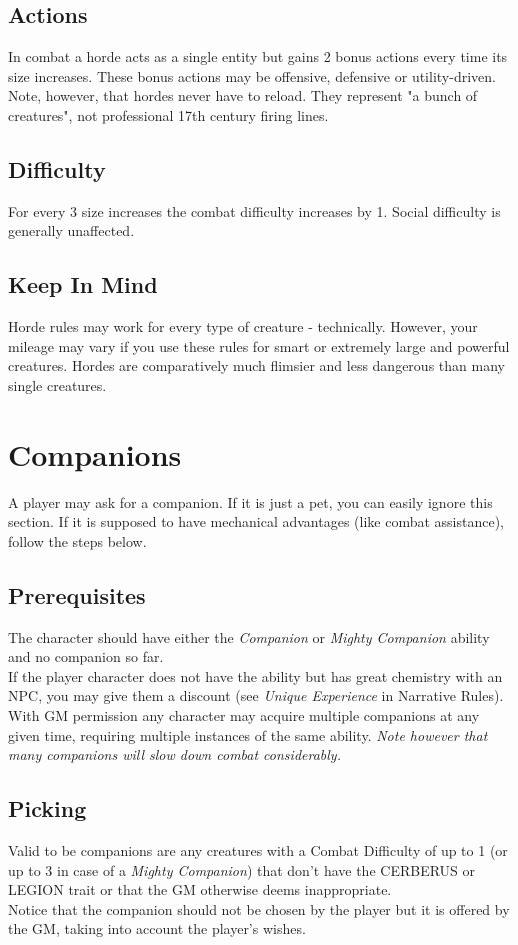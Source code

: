 \documentclass[12pt,a4paper,openany,usenames,dvipsnames]{book}
\begin{document}
	\subsection*{Actions}
	In combat a horde acts as a single entity but gains 2 bonus actions every time its size increases. These bonus actions may be offensive, defensive or utility-driven. \\
	Note, however, that hordes never have to reload. They represent "a bunch of creatures", not professional 17th century firing lines.
	
	\subsection*{Difficulty}
	For every 3 size increases the combat difficulty increases by 1. Social difficulty is generally unaffected.
	
	\subsection*{Keep In Mind}
	Horde rules may work for every type of creature - technically. However, your mileage may vary if you use these rules for smart or extremely large and powerful creatures. Hordes are comparatively much flimsier and less dangerous than many single creatures.
	
	
	\section{Companions}
	A player may ask for a companion. If it is just a pet, you can easily ignore this section. If it is supposed to have mechanical advantages (like combat assistance), follow the steps below.
	\subsection{Prerequisites}
	The character should have either the \textit{Companion} or \textit{Mighty Companion} ability and no companion so far.\\
	If the player character does not have the ability but has great chemistry with an NPC, you may give them a discount (see \textit{Unique Experience} in Narrative Rules).\\
	With GM permission any character may acquire multiple companions at any given time,
		requiring multiple instances of the same ability.
	\textit{Note however that many companions will slow down combat considerably.}
	\subsection{Picking}
	Valid to be companions are any creatures with a Combat Difficulty of up to 1 (or up to 3 in case of a \textit{Mighty Companion}) that don't have the CERBERUS or LEGION trait or that the GM otherwise deems inappropriate.\\
	Notice that the companion should not be chosen by the player but it is offered by the GM, taking into account the player's wishes.
\end{document}
